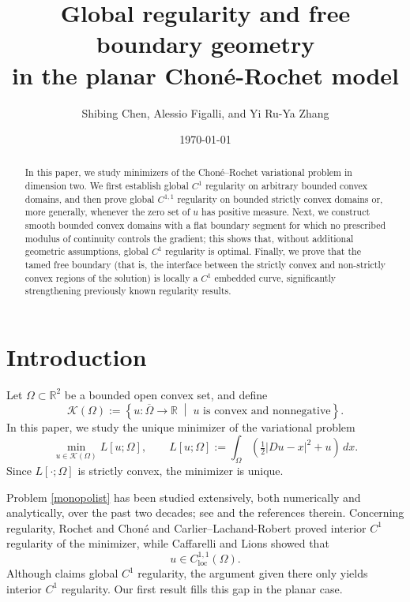 \documentclass[reqno,11pt]{amsart}
\title[Global regularity in the planar Chon\'e-Rochet model]{Global regularity and free boundary geometry \\ in the planar Chon\'e-Rochet model}
\author{Shibing Chen, Alessio Figalli, and Yi Ru-Ya Zhang}
\date{\today}
\numberwithin{equation}{section}
\theoremstyle{remark}
\begin{document}
\begin{abstract}
In this paper, we study minimizers of the Chon\'e--Rochet variational problem in dimension two. We first establish global $C^1$ regularity on arbitrary bounded convex domains, and then prove global $C^{1,1}$ regularity on bounded strictly convex domains or, more generally, whenever the zero set of $u$ has positive measure. Next, we construct smooth bounded convex domains with a flat boundary segment for which no prescribed modulus of continuity controls the gradient; this shows that, without additional geometric assumptions, global $C^1$ regularity is optimal. Finally, we prove that the tamed free boundary (that is, the interface between the strictly convex and non-strictly convex regions of the solution) is locally a $C^1$ embedded curve, significantly strengthening previously known regularity results.
\end{abstract}



\maketitle


\section{Introduction}

Let $\Omega \subset \mathbb{R}^2$ be a bounded open convex set, and define
\[
\mathcal{K}(\Omega)
:=
\left\{
u:\overline{\Omega}\to\mathbb{R}
\;\middle|\;
u \text{ is convex and nonnegative}
\right\}.
\]
In this paper, we study the unique minimizer of the variational problem
\begin{equation}\label{monopolist}
    \min_{u \in \mathcal{K}(\Omega)} L[u;\Omega],
    \qquad
    L[u;\Omega]
    :=
    \int_{\Omega}
    \left(
        \tfrac12 |Du-x|^2 + u
    \right)\,dx.
\end{equation}
Since $L[\cdot;\Omega]$ is strictly convex, the minimizer is unique.

Problem \eqref{monopolist} has been studied extensively, both numerically and analytically, over the past two decades; see
\cite{CL2001a, EM2010, MO2014, MRZ20252, MRZ2025, MZ2024}
and the references therein.
Concerning regularity, Rochet and Chon\'e \cite{RC98} and Carlier--Lachand-Robert \cite{CL2001}
proved interior $C^1$ regularity of the minimizer, while Caffarelli and Lions \cite{CL2006}
showed that
\[
u\in C^{1,1}_{\mathrm{loc}}(\Omega).
\]
Although \cite{CL2001} claims global $C^1$ regularity, the argument given there only yields
interior $C^1$ regularity. Our first result fills this gap in the planar case.
\end{document}
